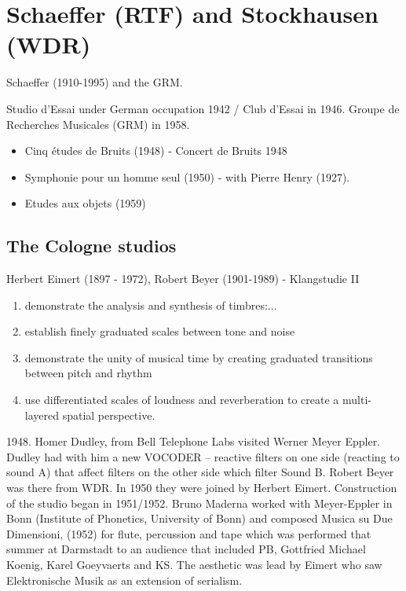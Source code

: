 \section{Schaeffer (RTF) and Stockhausen (WDR)}

Schaeffer (1910-1995) and the GRM.

Studio d'Essai under German occupation 1942 / Club d'Essai in 1946. Groupe de Recherches Musicales (GRM) in 1958.

\begin{itemize}
\item Cinq \'etudes de Bruits (1948) - Concert de Bruits 1948
\item Symphonie pour un homme seul (1950) - with Pierre Henry (1927).
\item Etudes aux objets (1959)
\end{itemize}

\subsection{The Cologne studios}

Herbert Eimert (1897 - 1972), Robert Beyer (1901-1989) - Klangstudie II

\begin{enumerate}
\item demonstrate the analysis and synthesis of timbres:...
\item establish finely graduated scales between tone and noise
\item demonstrate the unity of musical time by creating graduated transitions between pitch and rhythm
\item use differentiated scales of loudness and reverberation to create a multi-layered spatial perspective.
\end{enumerate}

1948. Homer Dudley, from Bell Telephone Labs visited Werner Meyer Eppler.  Dudley had with him a new VOCODER – reactive filters on one side (reacting to sound A) that affect filters on the other side which filter Sound B. Robert Beyer was there from WDR. In 1950 they were joined by Herbert Eimert. Construction of the studio began in 1951/1952.  Bruno Maderna worked with Meyer-Eppler in Bonn (Institute of Phonetics, University of Bonn) and composed Musica su Due Dimensioni, (1952) for flute, percussion and tape which was performed that summer at Darmstadt to an audience that included PB, Gottfried Michael Koenig, Karel Goeyvaerts and KS.  The aesthetic was lead by Eimert who saw Elektronische Musik as an extension of serialism.

